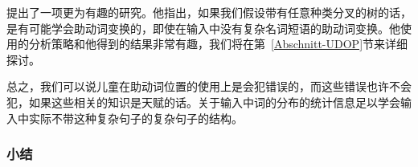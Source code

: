 
\citet{Bod2009a}提出了一项更为有趣的研究。他指出，如果我们假设带有任意种类分叉的树的话，是有可能学会助动词变换的，即使在输入中没有复杂名词短语的助动词变换。他使用的分析策略和他得到的结果非常有趣，我们将在第~\ref{Abschnitt-UDOP}节来详细探讨。

总之，我们可以说儿童在助动词位置的使用上是会犯错误的，而这些错误也许不会犯，如果这些相关的知识是天赋的话。关于输入中词的分布的统计信息足以学会输入中实际不带这种复杂句子的复杂句子的结构。

\subsubsection{小结}

